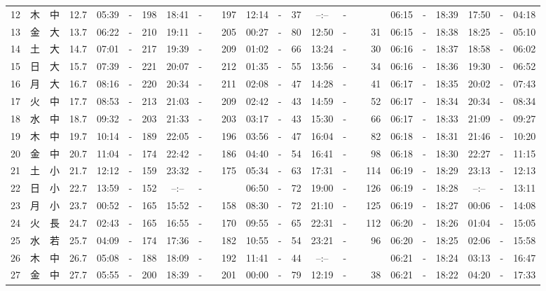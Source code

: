 \documentclass[12pt,a4j]{jsarticle}
\begin{document}
\begin{table}[htbp]
\begin{center}
{\begin{tabular}{|rc|cr|ccrccr|ccrccr|ccc|ccc|}
12 & 木 & 中 & 12.7 &  05:39 &-& 198 &  18:41 &-& 197 &  12:14 &-&  37 &  --:-- &-&~~~~~ & 06:15 & -& 18:39 & 17:50 & -& 04:18 \\
13 & 金 & 大 & 13.7 &  06:22 &-& 210 &  19:11 &-& 205 &  00:27 &-&  80 &  12:50 &-&  31 & 06:15 & -& 18:38 & 18:25 & -& 05:10 \\
14 & 土 & 大 & 14.7 &  07:01 &-& 217 &  19:39 &-& 209 &  01:02 &-&  66 &  13:24 &-&  30 & 06:16 & -& 18:37 & 18:58 & -& 06:02 \\
15 & 日 & 大 & 15.7 &  07:39 &-& 221 &  20:07 &-& 212 &  01:35 &-&  55 &  13:56 &-&  34 & 06:16 & -& 18:36 & 19:30 & -& 06:52 \\
16 & 月 & 大 & 16.7 &  08:16 &-& 220 &  20:34 &-& 211 &  02:08 &-&  47 &  14:28 &-&  41 & 06:17 & -& 18:35 & 20:02 & -& 07:43 \\
17 & 火 & 中 & 17.7 &  08:53 &-& 213 &  21:03 &-& 209 &  02:42 &-&  43 &  14:59 &-&  52 & 06:17 & -& 18:34 & 20:34 & -& 08:34 \\
18 & 水 & 中 & 18.7 &  09:32 &-& 203 &  21:33 &-& 203 &  03:17 &-&  43 &  15:30 &-&  66 & 06:17 & -& 18:33 & 21:09 & -& 09:27 \\
19 & 木 & 中 & 19.7 &  10:14 &-& 189 &  22:05 &-& 196 &  03:56 &-&  47 &  16:04 &-&  82 & 06:18 & -& 18:31 & 21:46 & -& 10:20 \\
20 & 金 & 中 & 20.7 &  11:04 &-& 174 &  22:42 &-& 186 &  04:40 &-&  54 &  16:41 &-&  98 & 06:18 & -& 18:30 & 22:27 & -& 11:15 \\
21 & 土 & 小 & 21.7 &  12:12 &-& 159 &  23:32 &-& 175 &  05:34 &-&  63 &  17:31 &-& 114 & 06:19 & -& 18:29 & 23:13 & -& 12:13 \\
22 & 日 & 小 & 22.7 &  13:59 &-& 152 &  --:-- &-&~~~~~ &  06:50 &-&  72 &  19:00 &-& 126 & 06:19 & -& 18:28 & --:-- & -& 13:11 \\
23 & 月 & 小 & 23.7 &  00:52 &-& 165 &  15:52 &-& 158 &  08:30 &-&  72 &  21:10 &-& 125 & 06:19 & -& 18:27 & 00:06 & -& 14:08 \\
24 & 火 & 長 & 24.7 &  02:43 &-& 165 &  16:55 &-& 170 &  09:55 &-&  65 &  22:31 &-& 112 & 06:20 & -& 18:26 & 01:04 & -& 15:05 \\
25 & 水 & 若 & 25.7 &  04:09 &-& 174 &  17:36 &-& 182 &  10:55 &-&  54 &  23:21 &-&  96 & 06:20 & -& 18:25 & 02:06 & -& 15:58 \\
26 & 木 & 中 & 26.7 &  05:08 &-& 188 &  18:09 &-& 192 &  11:41 &-&  44 &  --:-- &-&~~~~~ & 06:21 & -& 18:24 & 03:13 & -& 16:47 \\
27 & 金 & 中 & 27.7 &  05:55 &-& 200 &  18:39 &-& 201 &  00:00 &-&  79 &  12:19 &-&  38 & 06:21 & -& 18:22 & 04:20 & -& 17:33 \\

\end{tabular}}
\end{center}
\end{table}
\end{document}
